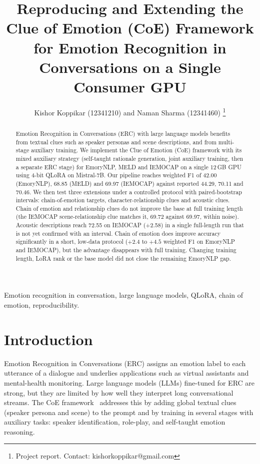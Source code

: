 \documentclass[lettersize,journal]{IEEEtran}
\begin{document}
\title{Reproducing and Extending the Clue of Emotion (CoE) Framework for Emotion Recognition in Conversations on a Single Consumer GPU}

\author{Kishor Koppikar (12341210) and Naman Sharma (12341460)
\thanks{Project report. Contact: kishorkoppikar@gmail.com}}

\maketitle

\begin{abstract}
Emotion Recognition in Conversations (ERC) with large language models benefits from textual clues such as speaker personas and scene descriptions, and from multi-stage auxiliary training. We implement the Clue of Emotion (CoE) framework with its mixed auxiliary strategy (self-taught rationale generation, joint auxiliary training, then a separate ERC stage) for EmoryNLP, MELD and IEMOCAP on a single 12\,GB GPU using 4-bit QLoRA on Mistral-7B. Our pipeline reaches weighted F1 of 42.00 (EmoryNLP), 68.85 (MELD) and 69.97 (IEMOCAP) against reported 44.29, 70.11 and 70.46. We then test three extensions under a controlled protocol with paired-bootstrap intervals: chain-of-emotion targets, character-relationship clues and acoustic clues. Chain of emotion and relationship clues do not improve the base at full training length (the IEMOCAP scene-relationship clue matches it, 69.72 against 69.97, within noise). Acoustic descriptions reach 72.55 on IEMOCAP (+2.58) in a single full-length run that is not yet confirmed with an interval. Chain of emotion does improve accuracy significantly in a short, low-data protocol ($+2.4$ to $+4.5$ weighted F1 on EmoryNLP and IEMOCAP), but the advantage disappears with full training. Changing training length, LoRA rank or the base model did not close the remaining EmoryNLP gap.
\end{abstract}

\begin{IEEEkeywords}
Emotion recognition in conversation, large language models, QLoRA, chain of emotion, reproducibility.
\end{IEEEkeywords}

\section{Introduction}
Emotion Recognition in Conversations (ERC) assigns an emotion label to each utterance of a dialogue and underlies applications such as virtual assistants and mental-health monitoring. Large language models (LLMs) fine-tuned for ERC are strong, but they are limited by how well they interpret long conversational streams. The CoE framework~\cite{coe2025} addresses this by adding global textual clues (speaker persona and scene) to the prompt and by training in several stages with auxiliary tasks: speaker identification, role-play, and self-taught emotion reasoning.
\end{document}
